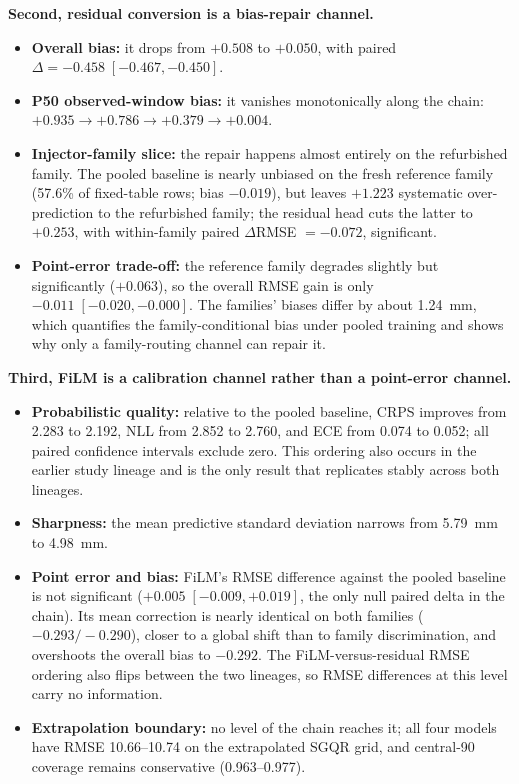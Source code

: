 \textbf{Second, residual conversion is a bias-repair channel.}
\begin{itemize}
  \item \textbf{Overall bias:} it drops from \(+0.508\) to \(+0.050\), with paired
  \(\Delta=-0.458\;[-0.467,-0.450]\).
  \item \textbf{P50 observed-window bias:} it vanishes monotonically along the chain:
  \(+0.935 \to +0.786 \to +0.379 \to +0.004\).
  \item \textbf{Injector-family slice:} the repair happens almost entirely on the refurbished family. The pooled
  baseline is nearly unbiased on the fresh reference family (57.6\% of fixed-table rows; bias \(-0.019\)), but leaves
  \(+1.223\) systematic over-prediction to the refurbished family; the residual head cuts the latter to \(+0.253\),
  with within-family paired \(\Delta\)RMSE \(=-0.072\), significant.
  \item \textbf{Point-error trade-off:} the reference family degrades slightly but significantly (\(+0.063\)), so the
  overall RMSE gain is only \(-0.011\;[-0.020,-0.000]\). The families' biases differ by about \SI{1.24}{mm}, which
  quantifies the family-conditional bias under pooled training and shows why only a family-routing channel can repair it.
\end{itemize}

\textbf{Third, FiLM is a calibration channel rather than a point-error channel.}
\begin{itemize}
  \item \textbf{Probabilistic quality:} relative to the pooled baseline, CRPS improves from 2.283 to 2.192, NLL from
  2.852 to 2.760, and ECE from 0.074 to 0.052; all paired confidence intervals exclude zero. This ordering also occurs
  in the earlier study lineage and is the only result that replicates stably across both lineages.
  \item \textbf{Sharpness:} the mean predictive standard deviation narrows from \SI{5.79}{mm} to \SI{4.98}{mm}.
  \item \textbf{Point error and bias:} FiLM's RMSE difference against the pooled baseline is not significant
  (\(+0.005\;[-0.009,+0.019]\), the only null paired delta in the chain). Its mean correction is nearly identical on
  both families (\(-0.293/-0.290\)), closer to a global shift than to family discrimination, and overshoots the overall
  bias to \(-0.292\). The FiLM-versus-residual RMSE ordering also flips between the two lineages, so RMSE differences
  at this level carry no information.
  \item \textbf{Extrapolation boundary:} no level of the chain reaches it; all four models have RMSE 10.66--10.74 on
  the extrapolated SGQR grid, and central-90 coverage remains conservative (0.963--0.977).
\end{itemize}

